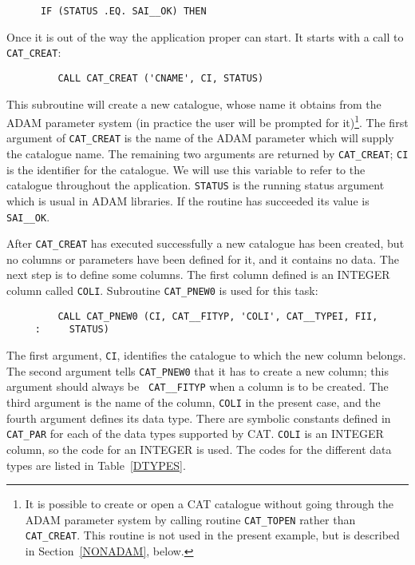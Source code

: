 \begin{verbatim}
      IF (STATUS .EQ. SAI__OK) THEN
\end{verbatim}

Once it is out of the way the application proper can start. It starts
with a call to {\tt CAT\_CREAT}:

\begin{verbatim}
         CALL CAT_CREAT ('CNAME', CI, STATUS)
\end{verbatim}

This subroutine will create a new catalogue, whose name it obtains
from the ADAM parameter system (in practice the user will be prompted
for it)\footnote{It is possible to create or open a CAT catalogue
without going through the ADAM parameter system by calling routine
{\tt CAT\_TOPEN} rather than {\tt CAT\_CREAT}. This routine is not used
in the present example, but is described in Section~\ref{NONADAM},
below.}. The first argument of {\tt CAT\_CREAT} is the name of the ADAM
parameter which will supply the catalogue name. The remaining two
arguments are returned by {\tt CAT\_CREAT}; {\tt CI} is the identifier
for the catalogue. We will use this variable to refer to the catalogue
throughout the application. {\tt STATUS} is the running status argument
which is usual in ADAM libraries. If the routine has succeeded its value
is {\tt SAI\_\_OK}.

After {\tt CAT\_CREAT} has executed successfully a new catalogue has
been created, but no columns or parameters have been defined for it,
and it contains no data. The next step is to define some columns. The
first column defined is an INTEGER column called {\tt COLI}. Subroutine
{\tt CAT\_PNEW0} is used for this task:

\begin{verbatim}
         CALL CAT_PNEW0 (CI, CAT__FITYP, 'COLI', CAT__TYPEI, FII,
     :     STATUS)
\end{verbatim}

The first argument, {\tt CI}, identifies the catalogue to which the
new column belongs. The second argument tells {\tt CAT\_PNEW0} that it
has to create a new column; this argument should always be {\tt
CAT\_\_FITYP} when a column is to be created. The third argument is the
name of the column, {\tt COLI} in the present case, and the fourth
argument defines its data type. There are symbolic constants defined in
{\tt CAT\_PAR} for each of the data types supported by CAT. {\tt COLI}
is an INTEGER column, so the code for an INTEGER is used. The codes for
the different data types are listed in Table~\ref{DTYPES}.

